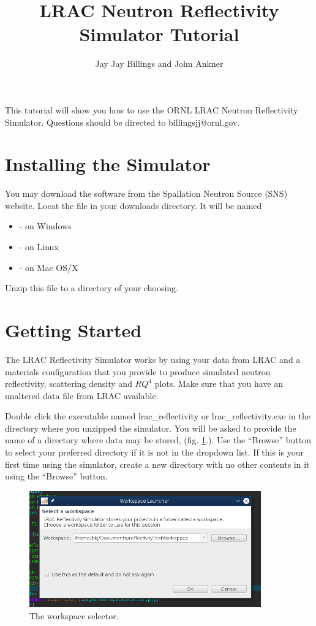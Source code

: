 \documentclass{article}
\begin{document}
\title{LRAC Neutron Reflectivity Simulator Tutorial}
\author{Jay Jay Billings and John Ankner}
\maketitle

This tutorial will show you how to use the ORNL LRAC Neutron Reflectivity
Simulator. Questions should be directed to billingsjj@ornl.gov.

\section{Installing the Simulator}

You may download the software from the Spallation Neutron Source (SNS) website.
Locat the file in your downloads directory. It will be named
\begin{itemize}
  \item - on Windows
  \item - on Linux
  \item - on Mac OS/X
\end{itemize}

Unzip this file to a directory of your choosing. 

\section{Getting Started}

The LRAC Reflectivity Simulator works by using your data from LRAC and a
materials configuration that you provide to produce simulated
neutron reflectivity, scattering density and $RQ^4$ plots. Make sure that you
have an unaltered data file from LRAC available.

Double click the executable named lrac\_reflectivity or lrac\_reflectivity.exe
in the directory where you unzipped the simulator. You will be asked to provide the
name of a directory where data may be stored, (fig. \ref{workspace}.). Use the
``Browse'' button to select your preferred directory if it is not in the dropdown list. If
this is your first time using the simulator, create a new directory with no
other contents in it using the ``Browse'' button.

\begin{figure}[!h]
\centering
\includegraphics[width=10cm]{images/workspaceSelector.png}
\caption{The workspace selector.}
\label{workspace}
\end{figure}
\end{document}
